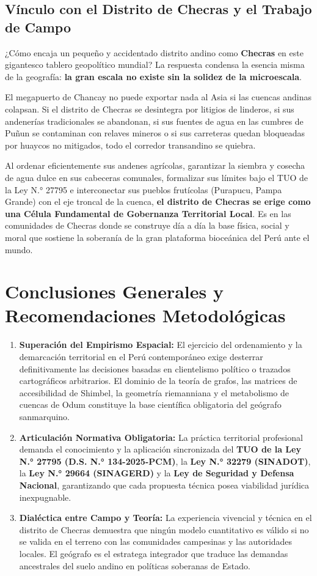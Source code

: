 \documentclass[11pt,a4paper]{article}
\begin{document}
\subsection{Vínculo con el Distrito de Checras y el Trabajo de Campo}
¿Cómo encaja un pequeño y accidentado distrito andino como \textbf{Checras} en este gigantesco tablero geopolítico mundial? La respuesta condensa la esencia misma de la geografía: \textbf{la gran escala no existe sin la solidez de la microescala}.

El megapuerto de Chancay no puede exportar nada al Asia si las cuencas andinas colapsan. Si el distrito de Checras se desintegra por litigios de linderos, si sus andenerías tradicionales se abandonan, si sus fuentes de agua en las cumbres de Puñun se contaminan con relaves mineros o si sus carreteras quedan bloqueadas por huaycos no mitigados, todo el corredor transandino se quiebra. 

Al ordenar eficientemente sus andenes agrícolas, garantizar la siembra y cosecha de agua dulce en sus cabeceras comunales, formalizar sus límites bajo el TUO de la Ley N.° 27795 e interconectar sus pueblos frutícolas (Purapucu, Pampa Grande) con el eje troncal de la cuenca, \textbf{el distrito de Checras se erige como una Célula Fundamental de Gobernanza Territorial Local}. Es en las comunidades de Checras donde se construye día a día la base física, social y moral que sostiene la soberanía de la gran plataforma bioceánica del Perú ante el mundo.


\newpage
\section*{Conclusiones Generales y Recomendaciones Metodológicas}

\begin{enumerate}
    \item \textbf{Superación del Empirismo Espacial:} El ejercicio del ordenamiento y la demarcación territorial en el Perú contemporáneo exige desterrar definitivamente las decisiones basadas en clientelismo político o trazados cartográficos arbitrarios. El dominio de la teoría de grafos, las matrices de accesibilidad de Shimbel, la geometría riemanniana y el metabolismo de cuencas de Odum constituye la base científica obligatoria del geógrafo sanmarquino.
    \item \textbf{Articulación Normativa Obligatoria:} La práctica territorial profesional demanda el conocimiento y la aplicación sincronizada del \textbf{TUO de la Ley N.° 27795 (D.S. N.° 134-2025-PCM)}, la \textbf{Ley N.° 32279 (SINADOT)}, la \textbf{Ley N.° 29664 (SINAGERD)} y la \textbf{Ley de Seguridad y Defensa Nacional}, garantizando que cada propuesta técnica posea viabilidad jurídica inexpugnable.
    \item \textbf{Dialéctica entre Campo y Teoría:} La experiencia vivencial y técnica en el distrito de Checras demuestra que ningún modelo cuantitativo es válido si no se valida en el terreno con las comunidades campesinas y las autoridades locales. El geógrafo es el estratega integrador que traduce las demandas ancestrales del suelo andino en políticas soberanas de Estado.
\end{enumerate}
\end{document}
